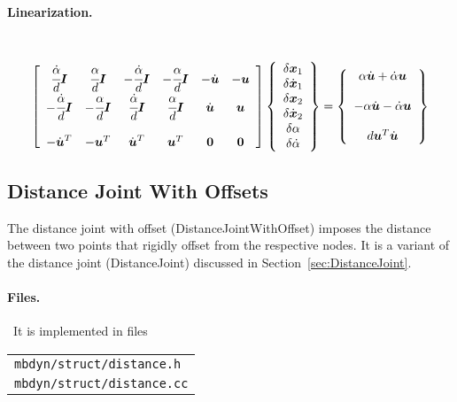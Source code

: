 \documentclass[10pt,dvips,fleqn]{report}
\newcommand{\T}[1]{\boldsymbol{#1}}
\begin{document}
\paragraph{Linearization.} \
\begin{equation}
        \sqbr{\matr{cccccc}{
		\cfrac{\dot{\alpha}}{d}\T{I} & \cfrac{\alpha}{d}\T{I} &
			-\cfrac{\dot{\alpha}}{d}\T{I} & -\cfrac{\alpha}{d}\T{I} &
			-\dot{\T{u}} & -\T{u} \\
		-\cfrac{\dot{\alpha}}{d}\T{I} & -\cfrac{\alpha}{d}\T{I} &
			\cfrac{\dot{\alpha}}{d}\T{I} & \cfrac{\alpha}{d}\T{I} &
			\dot{\T{u}} & \T{u} \\
		\\
		-\dot{\T{u}}^T & -\T{u}^T & \dot{\T{u}}^T & \T{u}^T & \T{0} & \T{0}
	}}\cubr{\cvvect{
		\delta\T{x}_1 \\
		\delta\dot{\T{x}}_1 \\
		\delta\T{x}_2 \\
		\delta\dot{\T{x}}_2 \\
		\delta\alpha \\
		\delta\dot{\alpha}
	}} = \cubr{\cvvect{
		\alpha \dot{\T{u}} + \dot{\alpha} \T{u} \\
		\\
		-\alpha \dot{\T{u}} - \dot{\alpha} \T{u} \\
		\\
		d \T{u}^T \dot{\T{u}}
	}}
\end{equation}




\subsection{Distance Joint With Offsets}
\label{sec:DistanceJointWithOffset}
The distance joint with offset (DistanceJointWithOffset) 
imposes the distance between two points
that rigidly offset from the respective nodes.
It is a variant of the distance joint (DistanceJoint)
discussed in Section~\ref{sec:DistanceJoint}.

\paragraph{Files.} \
It is implemented in files

\begin{tabular}{l}
\texttt{mbdyn/struct/distance.h} \\
\texttt{mbdyn/struct/distance.cc}
\end{tabular}
\end{document}
